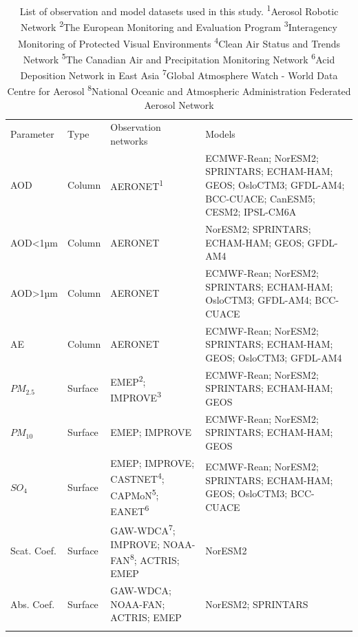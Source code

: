 \documentclass[journal abbreviation, manuscript]{copernicus}
\begin{document}
\begin{table}
 \begin{tabularx}{\textwidth}{lllX}
  \tophline
  Parameter   & Type    & Observation networks & Models                                                                                                    \\
  \middlehline
  AOD         & Column  & AERONET\textsuperscript{1}             & ECMWF-Rean; NorESM2; SPRINTARS; ECHAM-HAM; GEOS; OsloCTM3; GFDL-AM4; BCC-CUACE; CanESM5; CESM2; IPSL-CM6A \\
  AOD<1µm     & Column  & AERONET             & NorESM2; SPRINTARS; ECHAM-HAM; GEOS; GFDL-AM4                                                             \\
  AOD>1µm     & Column  & AERONET             & ECMWF-Rean; NorESM2; SPRINTARS; ECHAM-HAM; OsloCTM3; GFDL-AM4; BCC-CUACE                                  \\
  AE          & Column  & AERONET             & ECMWF-Rean; NorESM2; SPRINTARS; ECHAM-HAM; GEOS; OsloCTM3; GFDL-AM4                                       \\
  $PM_{2.5}$  & Surface & EMEP\textsuperscript{2}; IMPROVE\textsuperscript{3}                 & ECMWF-Rean;  NorESM2;  SPRINTARS;  ECHAM-HAM; GEOS                                                                                       \\
  $PM_{10}$   & Surface & EMEP; IMPROVE                 & ECMWF-Rean; NorESM2; SPRINTARS; ECHAM-HAM; GEOS                                                           \\
  $SO_{4}$    & Surface & EMEP; IMPROVE; CASTNET\textsuperscript{4}; CAPMoN\textsuperscript{5}; EANET\textsuperscript{6}             & ECMWF-Rean; NorESM2; SPRINTARS; ECHAM-HAM; GEOS; OsloCTM3; BCC-CUACE                                      \\
 Scat. Coef. & Surface & GAW-WDCA\textsuperscript{7}; IMPROVE; NOAA-FAN\textsuperscript{8}; ACTRIS; EMEP  & NorESM2                                                                                                   \\
  Abs. Coef.  & Surface & GAW-WDCA; NOAA-FAN; ACTRIS; EMEP  & NorESM2; SPRINTARS                                                                                        \\
  \bottomhline
 \end{tabularx}
 \caption{List of observation and model datasets used in this study.
 \textsuperscript{1}Aerosol Robotic Network
 \textsuperscript{2}The European Monitoring and Evaluation Program
 \textsuperscript{3}Interagency Monitoring of Protected Visual Environments
 \textsuperscript{4}Clean Air Status and Trends Network
 \textsuperscript{5}The Canadian Air and Precipitation Monitoring Network
 \textsuperscript{6}Acid Deposition Network in East Asia
 \textsuperscript{7}Global Atmosphere Watch - World Data Centre for Aerosol
 \textsuperscript{8}National Oceanic and Atmospheric Administration Federated Aerosol Network
 }
 \label{table:datasets}
\end{table}
\end{document}
